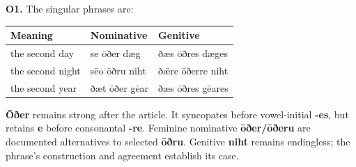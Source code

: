 \par\begin{minipage}{\linewidth}\raggedright
\textbf{O1.} The singular phrases are:

\par\begingroup
\fontsize{10.5}{13.2}\selectfont
\setlength{\LTleft}{0pt}\setlength{\LTright}{\fill}
\noindent
\begin{tabular}{@{}>{\raggedright\arraybackslash}p{38.47mm}>{\raggedright\arraybackslash}p{39.52mm}>{\raggedright\arraybackslash}p{40.39mm}@{}}
\toprule
\textbf{Meaning} & \textbf{Nominative} & \textbf{Genitive} \\
\midrule
the second day & se ōðer dæg & ðæs ōðres dæges \\
the second night & sēo ōðru niht & ðǣre ōðerre niht \\
the second year & ðæt ōðer gēar & ðæs ōðres gēares \\
\bottomrule
\end{tabular}
\par\endgroup

\textbf{Ōðer} remains strong after the article. It syncopates before vowel-initial \textbf{-es}, but retains \textbf{e} before consonantal \textbf{-re}. Feminine nominative \textbf{ōðer/\allowbreak{}ōðeru} are documented alternatives to selected \textbf{ōðru}. Genitive \textbf{niht} remains endingless; the phrase’s construction and agreement establish its case.

\end{minipage}\par\addvspace{4pt}

